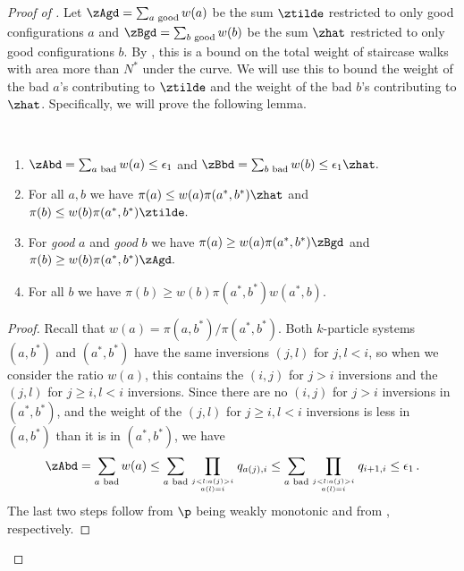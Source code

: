 \documentclass{toc}
\begin{document}
\begin{proof}[Proof of ]
Let $\zAgd = \sum_{a \text{ good}} w(a)$ be the sum $\ztilde$ restricted 
to only good configurations $a$ and $\zBgd = \sum_{b \text{ good}} w(b)$ 
be the sum $\zhat$ restricted to only good configurations $b$. 
By , this is a bound on the total weight of 
staircase walks with area more than $N^*$ under the curve.  We will use 
this to bound the weight of the bad $a$'s contributing to $\ztilde$ and 
the weight of the bad $b$'s contributing to $\zhat$.  Specifically, we 
will prove the following lemma.

\begin{lemma}\label{lem:zBound}\ \  
  \begin{enumerate}
  \item $\zAbd =  \sum_{a \text{ bad}} w(a) \leq \epsilon_1$ and $\zBbd =  \sum_{b \text{ bad}} w(b) \leq \epsilon_1\zhat.$
 \item For all $a,b$ we have $\pi(a)\leq w(a)\pi(a^*,b^*)\zhat$ and $\pi(b)\leq w(b)\pi(a^*,b^*)\ztilde.$
 \item For \emph{good} $a$ and \emph{good} $b$ we have $\pi(a) \geq w(a) \pi(a^*,b^*)\zBgd$ and $\pi(b) \geq w(b) \pi(a^*,b^*)\zAgd.$
 \item For all $b$ we have $\pi(b) \geq w(b)\pi(a^*,b^*)w(a^*,b).$
    \end{enumerate}
    \end{lemma}
\begin{proof}
 Recall that $w(a) = \pi(a,b^*)/\pi(a^*,b^*).$  Both $k$-particle 
systems $(a,b^*)$ and $(a^*,b^*)$ have the same inversions $(j,l)$ for 
$j,l < i$, so when we consider the ratio $w(a)$, this contains the 
$(i,j)$ for $j > i$ inversions and the $(j,l)$ for $j \geq i, l < i$ 
inversions. Since there are no $(i,j)$ for $j > i$ inversions in 
$(a^*,b^*)$, and the weight of the $(j,l)$ for $j \geq i, l < i$ 
inversions is less in $(a,b^*)$ than it is in $(a^*,b^*)$, we have 
$$\zAbd =  \sum_{a \text{ bad}} w(a) \leq \sum_{a \text{ 
bad}}\prod_{j<l: a(j) > i \atop a(l) = i}q_{a(j), i} \leq \sum_{a 
\text{ bad}}\prod_{j<l: a(j) > i \atop a(l) = i}q_{i+1, i} \leq 
\epsilon_1\,.$$ The last two steps follow from $\p$ being weakly 
monotonic and
from  %
, respectively.   


\end{proof}
\end{proof}
\end{document}
